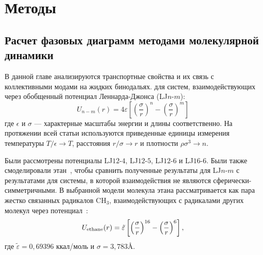 \section{Методы}
\label{MACR-SecMethods}

\subsection{Расчет фазовых диаграмм методами молекулярной динамики}
\label{MACR-SubSecMD}

В данной главе анализируются транспортные свойства и их связь с коллективными модами на жидких бинодальях.
для систем, взаимодействующих через обобщенный потенциал Леннарда-Джонса (LJ$n$-$m$):
\begin{equation}
U_{n-m}(r)=4 \varepsilon\left[\left(\frac{\sigma}{r}\right)^{n}-\left(\frac{\sigma}{r}\right)^{m}\right]
\label{MACR-eq1}
\end{equation}
где $\epsilon$ и $\sigma$ — характерные масштабы энергии и длины соответственно. На протяжении всей статьи используются приведенные единицы измерения температуры $ T/ \epsilon \rightarrow T $, расстояния $ r/ \sigma \rightarrow r $ и плотности $ \rho \sigma ^ 3 \rightarrow n$.


Были рассмотрены потенциалы LJ$12$-$4$, LJ$12$-$5$, LJ$12$-$6$ и LJ$16$-$6$. Были также смоделировали этан~\cite{10.1021/acs.jced.6b01036}, чтобы сравнить полученные результаты для LJ$n$-$m$ с результатами для системы, в которой взаимодействия не являются сферически-симметричными.
В выбранной модели молекула этана рассматривается как пара жестко связанных радикалов CH$_3$, взаимодействующих с радикалами других молекул через потенциал~\cite{10.1021/acs.jced.6b01036}:
\begin{equation}
U_{\rm {ethane}}(r) = \tilde \varepsilon\left[\left(\frac{\sigma}{r}\right)^{16}-\left(\frac{\sigma}{r}\right)^{6}\right],
\label{MACR-eq2}
\end{equation}
где $\tilde\varepsilon = 0,69396$ ккал/моль и $\sigma = 3,783$\AA.

